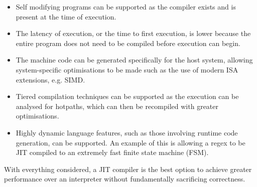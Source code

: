 \begin{itemize}
	\item Self modifying programs can be supported as the compiler exists and is present at the time of execution.
	
	\item The latency of execution, or the time to first execution, is lower because the entire program does not need to be compiled before execution can begin.
	
	\item The machine code can be generated specifically for the host system, allowing system-specific optimisations to be made such as the use of modern ISA extensions, e.g. SIMD.
	
	\item Tiered compilation techniques can be supported as the execution can be analysed for hotpaths, which can then be recompiled with greater optimisations.
	
	\item Highly dynamic language features, such as those involving runtime code generation, can be supported. An example of this is allowing a regex to be JIT compiled to an extremely fast finite state machine (FSM).
\end{itemize}

With everything considered, a JIT compiler is the best option to achieve greater performance over an interpreter without fundamentally sacrificing correctness.  

